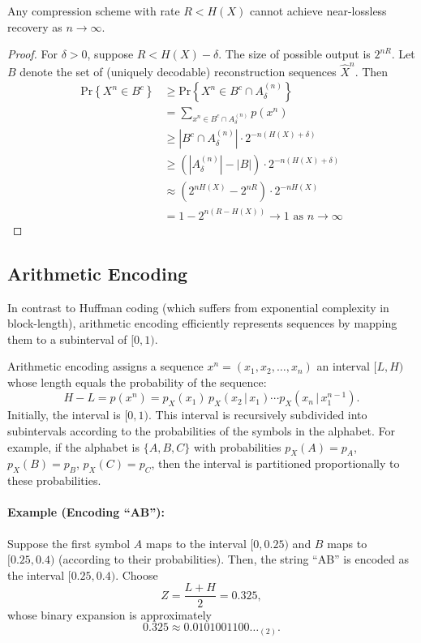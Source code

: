 \begin{theorem}[Converse]
Any compression scheme with rate $R<H(X)$ cannot achieve near-lossless recovery as $n\to\infty$.
\end{theorem}
\begin{proof}
For $\delta > 0$, suppose $R < H(X)-\delta$. The size of possible output is $2^{nR}.$ Let $B$ denote the set of (uniquely decodable) reconstruction sequences $\hat{X}^n$. Then 
$$
\begin{aligned}
    \text{Pr}\left\{X^n \in B^c\right\} &\geq \text{Pr}\left\{X^n \in B^c \cap A_\delta^{(n)}\right\}\\
    &=\sum_{x^n\in B^c \cap A_\delta^{(n)}}p(x^n)\\
    &\geq \left|B^c \cap A_\delta^{(n)}\right|\cdot2^{-n(H(X)+\delta)}\\
    &\geq \left(|A_\delta^{(n)}|-\left|B\right|\right)\cdot2^{-n(H(X)+\delta)}\\
    & \approx (2^{nH(X)}-2^{nR})\cdot2^{-nH(X)}\\ &=1-2^{n(R-H(X))} \rightarrow 1 \text{ as } n\rightarrow \infty
\end{aligned}
$$
\end{proof}

\subsection{Arithmetic Encoding}

In contrast to Huffman coding (which suffers from exponential complexity in block-length), arithmetic encoding efficiently represents sequences by mapping them to a subinterval of \([0,1)\).

Arithmetic encoding assigns a sequence \( x^n=(x_1,x_2,\ldots,x_n) \) an interval \([L,H)\) whose length equals the probability of the sequence:
\[
H - L = p(x^n) = p_X(x_1)\, p_X(x_2\,|\, x_1) \cdots p_X(x_n\,|\, x_1^{n-1}).
\]
Initially, the interval is \([0,1)\). This interval is recursively subdivided into subintervals according to the probabilities of the symbols in the alphabet. For example, if the alphabet is \(\{A, B, C\}\) with probabilities \(p_X(A)=p_A\), \(p_X(B)=p_B\), \(p_X(C)=p_C\), then the interval is partitioned proportionally to these probabilities.

\paragraph{Example (Encoding “AB”):}  
Suppose the first symbol \(A\) maps to the interval \([0,0.25)\) and \(B\) maps to \([0.25,0.4)\) (according to their probabilities). Then, the string “AB” is encoded as the interval \([0.25,0.4)\). Choose 
\[
Z = \frac{L+H}{2} = 0.325,
\]
whose binary expansion is approximately
\[
0.325 \approx 0.0101001100\ldots_{(2)}.
\]

